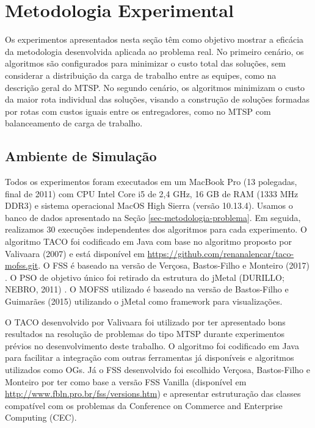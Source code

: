 \section{Metodologia Experimental}
\label{sec-metodologia-experimento}

Os experimentos apresentados nesta seção têm como objetivo mostrar a eficácia da metodologia desenvolvida aplicada ao problema real. No primeiro cenário, os algoritmos são configurados para minimizar o custo total das soluções, sem considerar a distribuição da carga de trabalho entre as equipes, como na descrição geral do MTSP. No segundo cenário, os algoritmos minimizam o custo da maior rota individual das soluções, visando a construção de soluções formadas por rotas com custos iguais entre os entregadores, como no MTSP com balanceamento de carga de trabalho.

\subsection{Ambiente de Simulação}
\label{subsec-metodologia-experimento}

Todos os experimentos foram executados em um MacBook Pro (13 polegadas, final de 2011) com CPU Intel Core i5 de 2,4 GHz, 16 GB de RAM (1333 MHz DDR3) e sistema operacional MacOS High Sierra (versão 10.13.4). Usamos o banco de dados apresentado na Seção \ref{sec-metodologia-problema}. Em seguida, realizamos 30 execuções independentes dos algoritmos para cada experimento. O algoritmo TACO foi codificado em Java com base no algoritmo proposto por Valivaara (2007) e está disponível em \url{https://github.com/renanalencar/taco-mofss.git}. O FSS é baseado na versão de Verçosa, Bastos-Filho e Monteiro (2017) \cite{verccosa2017combining}. O PSO de objetivo único foi retirado da estrutura do jMetal (DURILLO; NEBRO, 2011) \cite{durillo2011jmetal}. O MOFSS utilizado é baseado na versão de Bastos-Filho e Guimarães (2015) \cite{bastos2015multi} utilizando o jMetal como framework para visualizações.

O TACO desenvolvido por Valivaara foi utilizado por ter apresentado bons resultados na resolução de problemas do tipo MTSP durante experimentos prévios no desenvolvimento deste trabalho. O algoritmo foi codificado em Java para facilitar a integração com outras ferramentas já disponíveis e algoritmos utilizados como OGs. Já o FSS desenvolvido foi escolhido Verçosa, Bastos-Filho e Monteiro por ter como base a versão FSS Vanilla (disponível em \url{http://www.fbln.pro.br/fss/versions.htm}) e apresentar estruturação das classes compatível com os problemas da Conference on Commerce and Enterprise Computing (CEC). 

